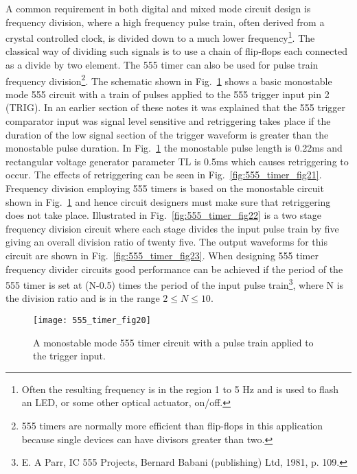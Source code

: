A common requirement in both digital and mixed mode circuit design is frequency division, where a high frequency pulse train, often derived from a crystal controlled clock, is divided down to a much lower frequency\footnote{Often the resulting frequency is in the region 1 to 5 Hz and is used to flash an LED, or some other optical actuator, on/off.}. The classical way of dividing such signals is to use a chain of flip-flops each connected as a divide by two element.  The 555 timer can also be used for pulse train frequency division\footnote{555 timers are normally more efficient than flip-flops in this application because single devices can have divisors greater than two.}. The schematic shown in Fig.~\ref{fig:555_timer_fig20} shows a basic monostable mode 555 circuit with a train of pulses applied to the 555 trigger input pin 2 (TRIG). In an earlier section of these notes it was explained that the 555 trigger comparator input was signal level sensitive and retriggering takes place if the duration of the low signal section of the trigger waveform is greater than the monostable pulse duration.  In Fig.~\ref{fig:555_timer_fig20} the monostable pulse length is 0.22ms and rectangular voltage generator parameter TL is 0.5ms which causes retriggering to occur.  The effects of retriggering can be seen in Fig.~\ref{fig:555_timer_fig21}.  Frequency division employing 555 timers is based on the monostable circuit shown in Fig.~\ref{fig:555_timer_fig20} and hence circuit designers must make sure that retriggering does not take place. Illustrated in Fig.~\ref{fig:555_timer_fig22} is a two stage frequency division circuit where each stage divides the input pulse train by five giving an overall division ratio of twenty five.  The output waveforms for this circuit are shown in Fig.~\ref{fig:555_timer_fig23}. When designing 555 timer frequency divider circuits good performance can be achieved if the period of the 555 timer is set at (N-0.5) times the period of the input pulse train\footnote{E. A Parr, IC 555 Projects, Bernard Babani (publishing) Ltd, 1981, p. 109.}, where N is the division ratio and is in the range $2 \leq N \leq 10$.

\FloatBarrier
\begin{figure}[ht]
  \centering
  \texttt{[image: 555\_timer\_fig20]}
  \caption{A monostable mode 555 timer circuit with a pulse train applied to the trigger input.}
  \label{fig:555_timer_fig20} 
\end{figure} 
\FloatBarrier 

